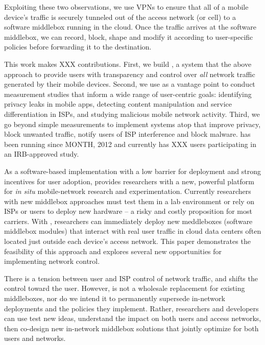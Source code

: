Exploiting these two observations, we use VPNs to ensure that all of a mobile device's traffic is 
securely tunneled out of the access network (\wifi or cell) to a software middlebox running 
in the cloud. Once the traffic arrives at the software middlebox, we 
can record, block, shape and modify it according to user-specific policies before forwarding it 
to the destination. 

This work 
makes XXX contributions. First, we build \meddle, a system that the above approach  
to provide users with transparency and control over \emph{all} network traffic generated by their 
mobile devices. Second, we use \meddle as a vantage point to conduct measurement studies that inform a 
wide range of user-centric goals: identifying privacy leaks in mobile apps, detecting content 
manipulation and service differentiation in ISPs, and studying malicious mobile network activity. 
Third, we go beyond simple measurements to implement systems atop \meddle that improve 
privacy, block unwanted traffic, notify users of ISP interference and block malware. \meddle has been running since 
MONTH, 2012 and currently has XXX users participating in an IRB-approved study. 

As a software-based implementation with a low barrier for deployment and strong incentives for 
user adoption, \meddle provides researchers with a new, powerful platform for \emph{in situ} 
mobile-network research and experimentation. Currently researchers with new  
middlebox approaches must test them in a lab environment or rely on ISPs or users to deploy 
new hardware -- a risky and costly proposition for most carriers. With \meddle, researchers 
can immediately deploy new meddleboxes (software middlebox modules) that interact with 
real user traffic in cloud data centers often located just outside each device's access network. 
This paper demonstrates the feasibility of this approach and explores several new opportunities 
for implementing network control.

There is a tension between user and ISP control of network traffic, and \meddle shifts the control 
toward the user. However, \meddle is not a wholesale replacement for existing middleboxes, nor do we intend it to permanently supersede 
in-network deployments and the policies they implement. Rather, researchers 
and developers can use \meddle test new ideas, understand the impact on both users and access networks, 
then co-design new in-network middlebox solutions that jointly optimize for both users and networks. 

